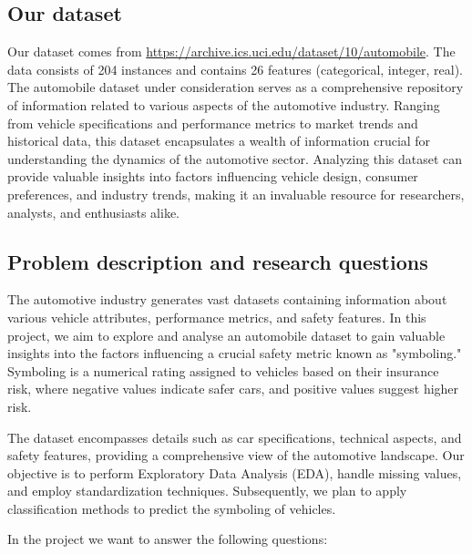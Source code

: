\documentclass[11pt,a4paper]{article}\usepackage[]{graphicx}\usepackage[]{xcolor}
\begin{document}
	\subsection{Our dataset}
	Our dataset comes from \url{https://archive.ics.uci.edu/dataset/10/automobile}. The data consists of 204 instances and contains 26 features (categorical, integer, real). The automobile dataset under consideration serves as a comprehensive repository of information related to various aspects of the automotive industry. Ranging from vehicle specifications and performance metrics to market trends and historical data, this dataset encapsulates a wealth of information crucial for understanding the dynamics of the automotive sector. Analyzing this dataset can provide valuable insights into factors influencing vehicle design, consumer preferences, and industry trends, making it an invaluable resource for researchers, analysts, and enthusiasts alike.
	
	\subsection{Problem description and research questions}
	
	The automotive industry generates vast datasets containing information about various vehicle attributes, performance metrics, and safety features. In this project, we aim to explore and analyse an automobile dataset to gain valuable insights into the factors influencing a crucial safety metric known as "symboling." Symboling is a numerical rating assigned to vehicles based on their insurance risk, where negative values indicate safer cars, and positive values suggest higher risk.

The dataset encompasses details such as car specifications, technical aspects, and safety features, providing a comprehensive view of the automotive landscape. Our objective is to perform Exploratory Data Analysis (EDA), handle missing values, and employ standardization techniques. Subsequently, we plan to apply classification methods to predict the symboling of vehicles.

In the project we want to answer the following questions:
\end{document}
